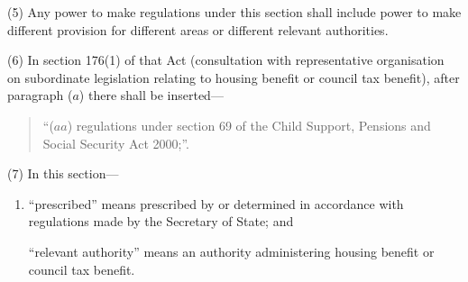 \documentclass[12pt,a4paper]{article}
\begin{document}
(5) Any power to make regulations under this section shall include power to make different provision for different areas or different relevant authorities.

(6) In section 176(1)  of that Act (consultation with representative organisation on subordinate legislation relating to housing benefit or council tax benefit), after paragraph ($a$)  there shall be inserted—
\begin{quotation}
“($aa$) regulations under section 69 of the Child Support, Pensions and Social Security Act 2000;”.
\end{quotation}

(7) In this section—
\begin{enumerate}\item[]
    “prescribed” means prescribed by or determined in accordance with regulations made by the Secretary of State; and

    “relevant authority” means an authority administering housing benefit or council tax benefit. 
\end{enumerate}

\end{document}
